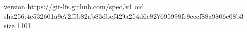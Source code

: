version https://git-lfs.github.com/spec/v1
oid sha256:4c532601a9e72f5b82ab83dbef429a254d6c827695998fe9cccf88a9806c08b3
size 1101
